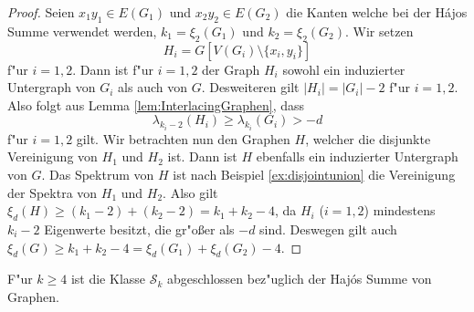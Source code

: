 \begin{proof}
  Seien $x_1y_1\in E(G_1)$ und $x_2y_2\in E(G_2)$ die Kanten welche bei der H\'ajos Summe verwendet werden, $k_1 = \xi_{2}(G_1)$ und $k_2 = \xi_{2}(G_2)$. Wir setzen $$H_i = G[V(G_i)\setminus\{x_i,y_i\}] $$ f"ur $i=1,2$. Dann ist f"ur $i=1,2$ der Graph $H_i$ sowohl ein induzierter Untergraph von $G_i$ als auch von $G$. 
  Desweiteren gilt $|H_i| = |G_i|-2$ f"ur $i=1,2$. Also folgt aus Lemma \ref{lem:InterlacingGraphen}, dass $$\lambda_{k_i-2}(H_i) \geq \lambda_{k_i}(G_i) > -d$$ f"ur $i=1,2$ gilt. Wir betrachten nun den Graphen $H$, welcher die disjunkte Vereinigung von $H_1$ und $H_2$ ist. Dann ist $H$ ebenfalls ein induzierter Untergraph von $G$. 
  Das Spektrum von $H$ ist nach Beispiel \ref{ex:disjointunion} die Vereinigung der Spektra von $H_1$ und $H_2$. Also gilt $\xi_{d}(H) \geq (k_1-2)+ (k_2-2) = k_1+k_2-4$, da $H_i$ ($i=1,2$) mindestens $k_i -2$ Eigenwerte besitzt, die gr"o{\ss}er als $-d$ sind.
  Deswegen gilt auch $\xi_{d}(G) \geq k_1+k_2-4 = \xi_{d}(G_1) + \xi_{d}(G_2) -4$.
\end{proof}

\begin{corollary}
  F"ur $k\geq4$ ist die Klasse $\mathcal{S}_k$ abgeschlossen bez"uglich der Haj\'os Summe von Graphen.
\end{corollary}
